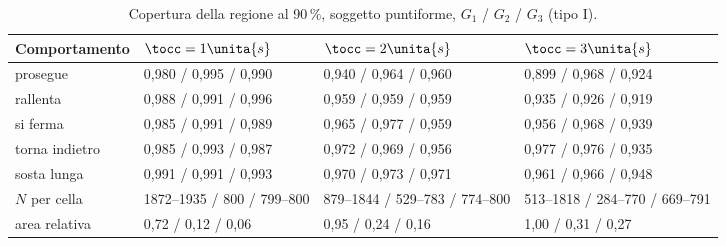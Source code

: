 \begin{table}[H]\centering\footnotesize
\caption{Copertura della regione al 90\,\%, soggetto puntiforme, $G_1$ / $G_2$ / $G_3$ (tipo I). }\label{tab:val-copertura}
\begin{tabular}{@{}llll@{}}
\toprule
Comportamento & $\tocc=1\unita{s}$ & $\tocc=2\unita{s}$ & $\tocc=3\unita{s}$\\
\midrule
prosegue & 0,980 / 0,995 / 0,990 & 0,940 / 0,964 / 0,960 & 0,899 / 0,968 / 0,924\\
rallenta & 0,988 / 0,991 / 0,996 & 0,959 / 0,959 / 0,959 & 0,935 / 0,926 / 0,919\\
si ferma & 0,985 / 0,991 / 0,989 & 0,965 / 0,977 / 0,959 & 0,956 / 0,968 / 0,939\\
torna indietro & 0,985 / 0,993 / 0,987 & 0,972 / 0,969 / 0,956 & 0,977 / 0,976 / 0,935\\
sosta lunga & 0,991 / 0,991 / 0,993 & 0,970 / 0,973 / 0,971 & 0,961 / 0,966 / 0,948\\
\midrule
$N$ per cella & 1872–1935 / 800 / 799–800 & 879–1844 / 529–783 / 774–800 & 513–1818 / 284–770 / 669–791\\
area relativa & 0,72 / 0,12 / 0,06 & 0,95 / 0,24 / 0,16 & 1,00 / 0,31 / 0,27\\
\bottomrule
\end{tabular}
\end{table}

